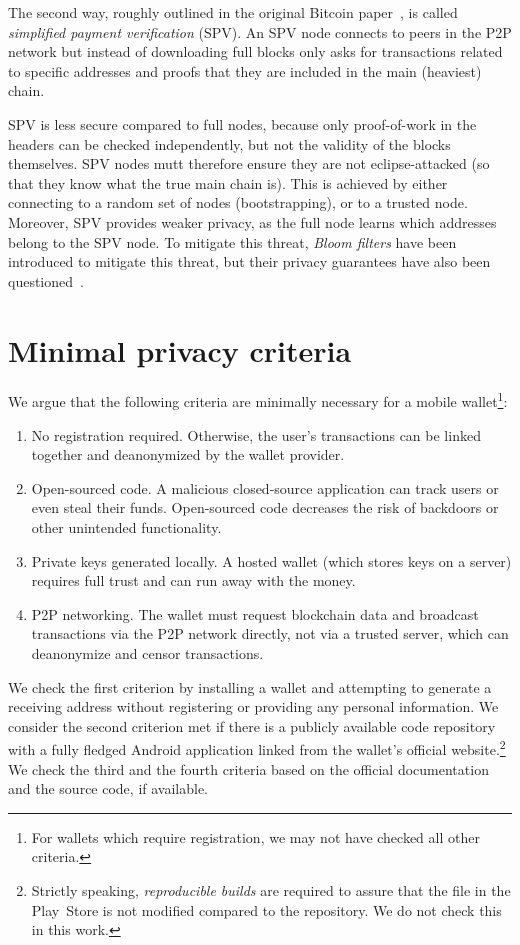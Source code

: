 The second way, roughly outlined in the original Bitcoin paper~\cite{Nakamoto2008}, is called \textit{simplified payment verification} (SPV).
An SPV node connects to peers in the P2P network but instead of downloading full blocks only asks for transactions related to specific addresses and proofs that they are included in the main (heaviest) chain.

SPV is less secure compared to full nodes, because only proof-of-work in the headers can be checked independently, but not the validity of the blocks themselves.
SPV nodes mutt therefore ensure they are not eclipse-attacked (so that they know what the true main chain is).
This is achieved by either connecting to a random set of nodes (bootstrapping), or to a trusted node.
Moreover, SPV provides weaker privacy, as the full node learns which addresses belong to the SPV node.
To mitigate this threat, \textit{Bloom filters} have been introduced to mitigate this threat, but their privacy guarantees have also been questioned~\cite{Gervais2014}.


\section{Minimal privacy criteria} \label{section:Ch04Initialprivacycriteria}

We argue that the following criteria are minimally necessary for a mobile wallet\footnote{For wallets which require registration, we may not have checked all other criteria.}:
\begin{enumerate}
	\item No registration required. Otherwise, the user's transactions can be linked together and deanonymized by the wallet provider. 
	\item Open-sourced code. A malicious closed-source application can track users or even steal their funds. Open-sourced code decreases the risk of backdoors or other unintended functionality. 
	\item Private keys generated locally. A hosted wallet (which stores keys on a server) requires full trust and can run away with the money.
	\item P2P networking. The wallet must request blockchain data and broadcast transactions via the P2P network directly, not via a trusted server, which can deanonymize and censor transactions.
\end{enumerate}
We check the first criterion by installing a wallet and attempting to generate a receiving address without registering or providing any personal information.
We consider the second criterion met if there is a publicly available code repository with a fully fledged Android application linked from the wallet's official website.\footnote{Strictly speaking, \textit{reproducible builds} are required to assure that the file in the Play~Store is not modified compared to the repository. We do not check this in this work.}
We check the third and the fourth criteria based on the official documentation and the source code, if available.

